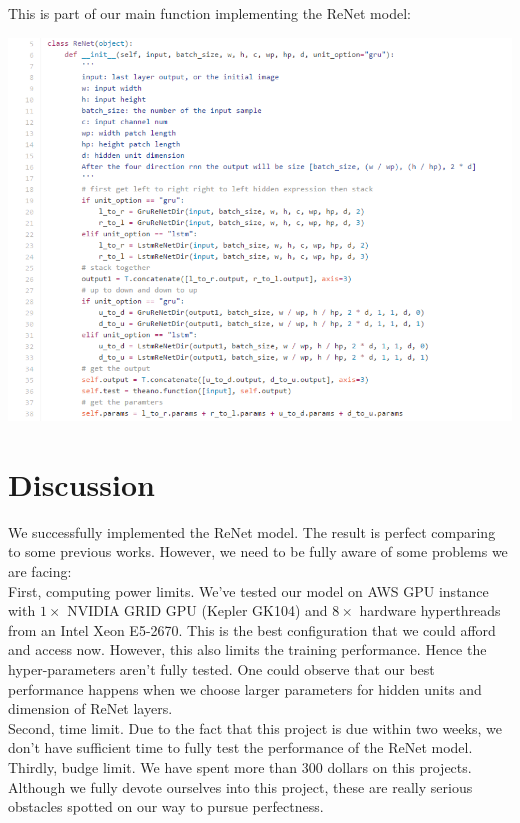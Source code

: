 \documentclass[final,leqno]{siamltex}
\begin{document}
This is part of our main function implementing the ReNet model:\\
\begin{center}
\includegraphics[scale=0.8]{Figures/algo}	
\end{center}

\section{Discussion} \label{discussion}
We successfully implemented the ReNet model. The result is perfect comparing to some previous works. However, we need to be fully aware of some problems we are facing:\\

First, computing power limits. We've tested our model on AWS GPU instance with $1 \times$ NVIDIA GRID GPU (Kepler GK104) and $8 \times$ hardware hyperthreads from an Intel Xeon E5-2670. This is the best configuration that we could afford and access now. However, this also limits the training performance. Hence the hyper-parameters aren't fully tested. One could observe that our best performance happens when we choose larger parameters for hidden units and dimension of ReNet layers.\\

Second, time limit. Due to the fact that this project is due within two weeks, we don't have sufficient time to fully test the performance of the ReNet model.\\

Thirdly, budge limit. We have spent more than 300 dollars on this projects. Although we fully devote ourselves into this project, these are really serious obstacles spotted on our way to pursue perfectness. \\
\end{document}
